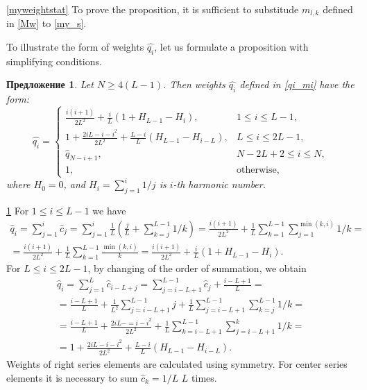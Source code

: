 \documentclass[12pt,a4paper,fleqn,leqno]{article}
\newtheorem{proposition}{Предложение}
\begin{document}
\begin{proof5}{\ref{myweightstat}}
To prove the proposition, it is sufficient to substitude $m_{l,k}$ defined in \eqref{Mw} to \eqref{my_s}.
\end{proof5}

To illustrate the form of weights $\hat{q_i}$, let us formulate a proposition with simplifying conditions.

\begin{proposition} \label{myserweightstat}
Let $N \ge 4(L-1)$. Then weights $\hat{q_i}$ defined in \eqref{qi_mi}
have the form:
\begin{equation*}
\hat{q_i} = \begin{cases}
\frac{i(i+1)}{2 L^2} + \frac{i}{L}(1 + H_{L-1} - H_i), &1 \le i \le L-1, \\
1 + \frac{2iL-i-i^2}{2L^2} + \frac{L-i}{L}(H_{L-1} - H_{i - L}), & L \le i \le 2L-1, \\
\hat{q}_{N-i+1}, &N-2L+2 \le i \le N, \\
1, &\text{otherwise},
\end{cases}
\end{equation*}
where $H_0 = 0$, and $H_i = \sum_{j=1}^i 1/j$ is $i$-th harmonic number.
\end{proposition}

\begin{proof5}{\ref{myserweightstat}}
For $1 \le i \le L-1$ we have
\begin{gather*}
\hat{q}_i = \sum_{j=1}^i \hat{c}_j = \sum_{j=1}^i \frac{1}{L}\left(\frac{j}{L} + \sum_{k=j}^{L-1}1/k\right)\! =
\frac{i(i+1)}{2L^2}+\frac{1}{L} \sum_{k = 1}^{L-1} \sum_{j=1}^{\min(k,i)} 1/k =\\= \frac{i(i+1)}{2L^2}+\frac{1}{L} \sum_{k = 1}^{L-1} \frac{\min(k,i)}{k} = \frac{i(i+1)}{2 L^2} + \frac{i}{L}(1 + H_{L-1} - H_i).
\end{gather*}
For $L \le i \le 2L-1$, by changing of the order of summation, we obtain
\begin{gather*}
\hat{q}_i = \sum_{j = 1}^L \hat{c}_{i-L+j} = \sum_{j = i - L + 1}^{L - 1} \hat{c}_j + \frac{i - L + 1}{L} =\\
=\frac{i - L + 1}{L} + \frac{1}{L^2} \sum_{j = i - L + 1}^{L-1}j + \frac{1}{L} \sum_{j = i-L + 1}^{L-1} \sum_{k=j}^{L-1}1/k =\\
=\frac{i - L + 1}{L} + \frac{2iL - =i - i^2}{2L^2} + \frac{1}{L} \sum_{k = i - L + 1}^{L - 1} \sum_{j = i - L + 1}^k 1/k =\\
=1 + \frac{2iL-i-i^2}{2L^2} + \frac{L-i}{L}(H_{L-1} - H_{i - L}).
\end{gather*}
Weights of right series elements are calculated using symmetry. For center series elements it is necessary to sum $\hat{c}_k = 1/L$ $L$ times.
\end{proof5}
\end{document}
